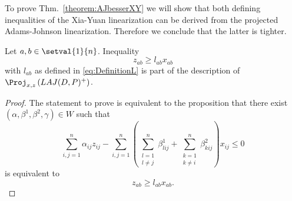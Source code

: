 To prove Thm.~\ref{theorem:AJbesserXY} we will show that both defining inequalities of the Xia-Yuan linearization can be derived from the projected Adams-Johnson linearization. Therefore we conclude that the latter is tighter.

\begin{proposition}
	\label{prop:inequalityLContained}
	Let $a,b \in\setval{1}{n}$. Inequality
	\begin{equation*}
		z_{ab}\geq l_{ab}x_{ab}
	\end{equation*}
	with $l_{ab}$ as defined in \eqref{eq:DefinitionL} is part of the description of $\Proj_{x,z}\left(LAJ(D,P)^+\right)$.
\end{proposition}

\begin{proof}
	The statement to prove is equivalent to the proposition that there exist $(\alpha, \beta^1, \beta^2, \gamma)\in W$ such that
	\begin{equation*}
		\sum_{i,j=1}^n\alpha_{ij}z_{ij} - \sum_{i,j=1}^n \left(\sum_{\substack{l=1\\l\neq j}}^n \beta^1_{lij} + \sum_{\substack{k=1\\k\neq i}}^n\beta^2_{kij}\right)x_{ij}\leq 0
	\end{equation*}
	is equivalent to
	\begin{equation*}
		z_{ab}\geq l_{ab}x_{ab}.
	\end{equation*}
	

\end{proof}
